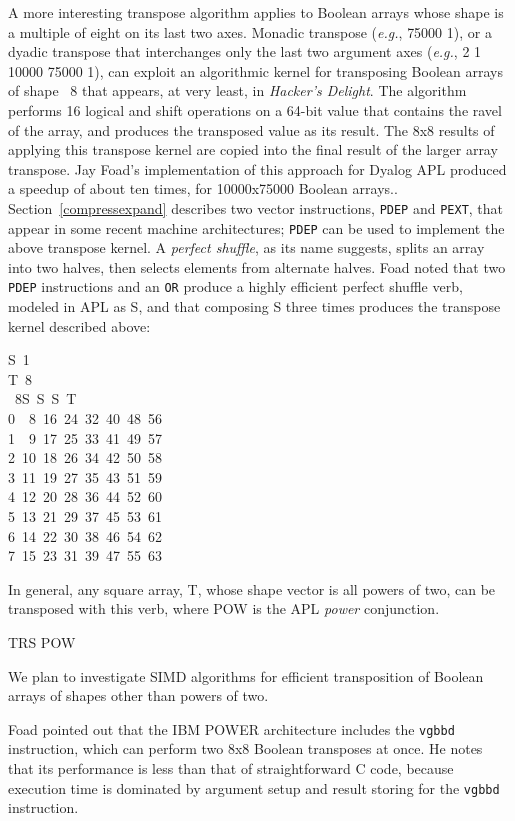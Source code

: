 \noindent
A more interesting transpose algorithm applies to 
Boolean arrays whose shape is a multiple of eight
on its last two axes. Monadic transpose 
({\em e.g.}, {\apl \qtran{} 75000\qrho{} 1}), or a 
dyadic transpose that interchanges only the last two argument axes
({\em e.g.}, { 2 1\qtran{} 10000 75000\qrho{} 1}), can exploit
an algorithmic kernel for transposing Boolean arrays of shape {~8} 
that appears, at very least, in 
{\em Hacker's Delight}.\cite{Warren:2012:HD:2462741}
The algorithm performs 16 logical and shift operations on
a 64-bit value that contains the ravel of the array, and
produces the transposed value as its result. The 8x8 results of
applying this transpose kernel are copied into the final result of the
larger array transpose. Jay Foad's implementation of this
approach for Dyalog APL produced a speedup of about ten times,
for 10000x75000 Boolean arrays.\cite{JFoad:pc2016}.
Section~\ref{compressexpand} describes two vector instructions,
{\tt PDEP} and {\tt PEXT},
that appear in some recent machine architectures; {\tt PDEP} can
be used to implement the above transpose kernel.
A {\em perfect shuffle}, as its name suggests, splits an array into
two halves, then selects elements from alternate halves.
Foad noted that two {\tt PDEP} instructions and an {\tt OR} produce a
highly efficient perfect shuffle verb, modeled in APL as {\apl S},
and that composing {\apl S} three times produces the 
transpose kernel described above:

{\apl S\qlarrow\qlbrace\qomega\qlbr\qugrade\qlpar\qrho\qomega\qrpar\qrho{}~1\qrbr\qrbrace}\\

{\apl T\qlarrow{}~8\qrho\qiota{}\\

{~8\qrho\0S~S~S~\qcomma\0T}\\
0~~8~16~24~32~40~48~56\\
1~~9~17~25~33~41~49~57\\
2~10~18~26~34~42~50~58\\
3~11~19~27~35~43~51~59\\
4~12~20~28~36~44~52~60\\
5~13~21~29~37~45~53~61\\
6~14~22~30~38~46~54~62\\
7~15~23~31~39~47~55~63\\
}

\noindent In general, any square array, {\apl T}, 
whose shape vector is all powers of two, can be transposed with this verb,
where {\apl POW} is the APL {\em power} conjunction.

{\apl TR\qlarrow\qlbrace\0S POW\qlpar{}\qlog{}\qrho\qrho\qomega\qrpar\qomega\qrbrace}

\noindent We plan to investigate SIMD algorithms
for efficient transposition of Boolean arrays of shapes other than
powers of two.

Foad pointed out that the IBM POWER architecture
includes the {\tt vgbbd} instruction, which can perform
two 8x8 Boolean transposes at once. 
He notes that its performance is less than that of straightforward 
C code, because execution time is dominated by
argument setup and result storing for the {\tt vgbbd} instruction.

